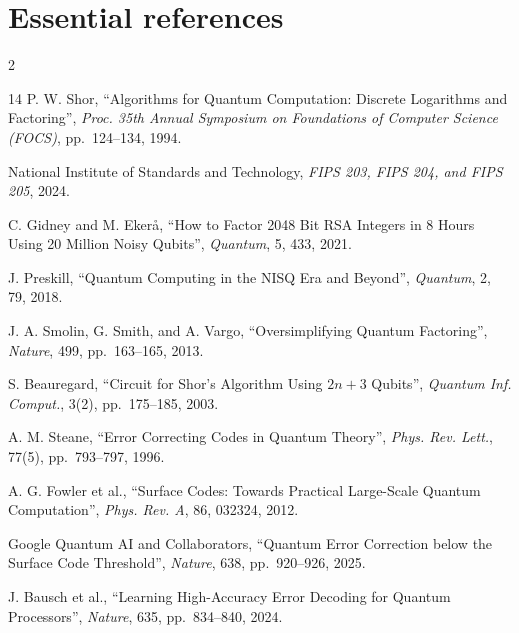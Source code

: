 \par
\vspace{-4pt}
\section{Essential references}
\begingroup
{}
\fontsize{6.4}{7.0}\selectfont
\setlength{\columnsep}{10pt}
\begin{multicols}{2}
\raggedcolumns
\raggedright
\renewcommand{\section}[1]{}%
\begin{thebibliography}{14}
\setlength{\itemsep}{-1pt}
\setlength{\parsep}{0pt}
 P. W. Shor, ``Algorithms for Quantum Computation: Discrete Logarithms and
Factoring'', \emph{Proc. 35th Annual Symposium on Foundations of Computer Science (FOCS)},
pp.~124--134, 1994.

 National Institute of Standards and Technology,
\emph{FIPS 203, FIPS 204, and FIPS 205}, 2024.

 C. Gidney and M. Eker\aa, ``How to Factor 2048 Bit RSA Integers
in 8 Hours Using 20 Million Noisy Qubits'', \emph{Quantum}, 5, 433, 2021.

 J. Preskill, ``Quantum Computing in the NISQ Era and Beyond'',
\emph{Quantum}, 2, 79, 2018.

 J. A. Smolin, G. Smith, and A. Vargo, ``Oversimplifying Quantum
Factoring'', \emph{Nature}, 499, pp.~163--165, 2013.

 S. Beauregard, ``Circuit for Shor's Algorithm Using \(2n+3\) Qubits'',
\emph{Quantum Inf. Comput.}, 3(2), pp.~175--185, 2003.

 A. M. Steane, ``Error Correcting Codes in Quantum Theory'',
\emph{Phys. Rev. Lett.}, 77(5), pp.~793--797, 1996.

 A. G. Fowler et al., ``Surface Codes: Towards Practical
Large-Scale Quantum Computation'', \emph{Phys. Rev. A}, 86, 032324, 2012.

 Google Quantum AI and Collaborators,
``Quantum Error Correction below the Surface Code Threshold'', \emph{Nature}, 638,
pp.~920--926, 2025.

 J. Bausch et al., ``Learning High-Accuracy Error Decoding
for Quantum Processors'', \emph{Nature}, 635, pp.~834--840, 2024.


\end{thebibliography}
\end{multicols}
